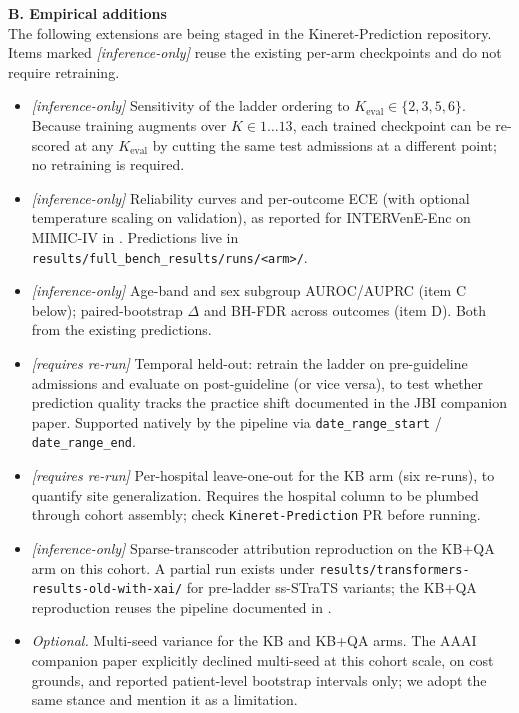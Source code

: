 \begin{center}
{{\textbf{B. Empirical additions}\\
The following extensions are being staged in the Kineret-Prediction
repository. Items marked \emph{[inference-only]} reuse the existing
per-arm checkpoints and do not require retraining.
\begin{itemize}\setlength{\itemsep}{.05em}
  \item \emph{[inference-only]} Sensitivity of the ladder ordering to
        $K_{\mathrm{eval}} \in \{2, 3, 5, 6\}$. Because training augments
        over $K \in 1\ldots 13$, each trained checkpoint can be re-scored
        at any $K_{\mathrm{eval}}$ by cutting the same test admissions at
        a different point; no retraining is required.
  \item \emph{[inference-only]} Reliability curves and per-outcome ECE
        (with optional temperature scaling on validation), as reported
        for INTERVenE-Enc on MIMIC-IV in \citep{oded2026intervene}.
        Predictions live in \texttt{results/full\_bench\_results/runs/<arm>/}.
  \item \emph{[inference-only]} Age-band and sex subgroup AUROC/AUPRC
        (item C below); paired-bootstrap $\Delta$ and BH-FDR across
        outcomes (item D). Both from the existing predictions.
  \item \emph{[requires re-run]} Temporal held-out: retrain the ladder
        on pre-guideline admissions and evaluate on post-guideline (or
        vice versa), to test whether prediction quality tracks the
        practice shift documented in the JBI companion paper. Supported
        natively by the pipeline via \texttt{date\_range\_start} /
        \texttt{date\_range\_end}.
  \item \emph{[requires re-run]} Per-hospital leave-one-out for the KB
        arm (six re-runs), to quantify site generalization. Requires the
        hospital column to be plumbed through cohort assembly; check
        \texttt{Kineret-Prediction} PR before running.
  \item \emph{[inference-only]} Sparse-transcoder attribution
        reproduction on the KB+QA arm on this cohort. A partial run
        exists under \texttt{results/transformers-results-old-with-xai/}
        for pre-ladder ss-STraTS variants; the KB+QA reproduction reuses
        the pipeline documented in \citep{oded2026intervene}.
  \item \emph{Optional.} Multi-seed variance for the KB and KB+QA arms.
        The AAAI companion paper explicitly declined multi-seed at this
        cohort scale, on cost grounds, and reported patient-level
        bootstrap intervals only; we adopt the same stance and mention
        it as a limitation.
\end{itemize}
\vspace{.1em}

}}
\end{center}
